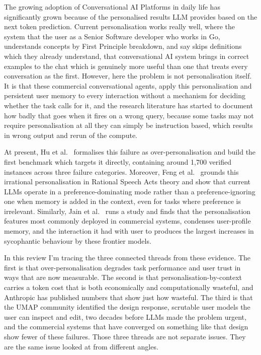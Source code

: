 \documentclass[runningheads]{llncs}
\begin{document}
The growing adoption of Conversational AI Platforms in daily life has significantly grown because of the personalised results LLM provides based on the next token prediction. Current personalisation works really well, where the system that the user as a Senior Software developer who works in Go, understands concepts by First Principle breakdown, and say skips definitions which they already understand, that conversational AI system brings in correct examples to the chat which is genuinely more useful than one that treats every conversation as the first. However, here the problem is not personalisation itself. It is that these commercial conversational agents, apply this personalisation and persistent user memory to every interaction without a mechanism for deciding whether the task calls for it, and the research literature has started to document how badly that goes when it fires on a wrong query, because some tasks may not require personalisation at all they can simply be instruction based, which results in wrong output and rerun of the compute.

At present, Hu et al.~\cite{opbench2026} formalises this failure as over-personalisation and build the first benchmark which targets it directly, containing around 1,700 verified instances across three failure categories. Moreover, Feng et al.~\cite{rpeval2026} grounds this irrational personalisation in Rational Speech Acts theory and show that current LLMs operate in a preference-dominating mode rather than a preference-ignoring one when memory is added in the context, even for tasks where preference is irrelevant. Similarly, Jain et al.~\cite{jain2026} runs a study and finds that the personalisation features most commonly deployed in commercial systems, condenses user-profile memory, and the interaction it had with user to produces the largest increases in sycophantic behaviour by these frontier models. 

In this review I'm tracing the three connected threads from these evidence. The first is that over-personalisation degrades task performance and user trust in ways that are now measurable. The second is that personalisation-by-context carries a token cost that is both economically and computationally wasteful, and Anthropic has published numbers that show just how wasteful. The third is that the UMAP community identified the design response, scrutable user models the user can inspect and edit, two decades before LLMs made the problem urgent, and the commercial systems that have converged on something like that design show fewer of these failures. Those three threads are not separate issues. They are the same issue looked at from different angles.
\end{document}
